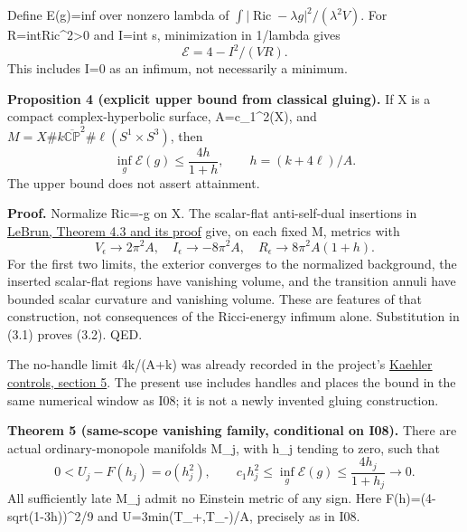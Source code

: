 \documentclass[
  10pt,
]{article}
\begin{document}
Define E(g)=inf over nonzero lambda of
\(\int|\operatorname{Ric}-\lambda g|^2/(\lambda^2 V)\). For
R=int\textbar Ric\textbar\^{}2\textgreater0 and I=int s, minimization in
1/lambda gives \[
 \mathcal E=4-I^2/(VR).                                  \tag{3.1}
\] This includes I=0 as an infimum, not necessarily a minimum.

\textbf{Proposition 4 (explicit upper bound from classical gluing).} If
X is a compact complex-hyperbolic surface, A=c\_1\^{}2(X), and
\(M=X\#k\overline{\mathbb{CP}}^2\#\ell(S^1\times S^3)\), then \[
 \inf_g\mathcal E(g)\le\frac{4h}{1+h},\qquad h=(k+4\ell)/A. \tag{3.2}
\] The upper bound does not assert attainment.

\textbf{Proof.} Normalize Ric=-g on X. The scalar-flat anti-self-dual
insertions in \href{https://arxiv.org/html/math/0003068}{LeBrun, Theorem
4.3 and its proof} give, on each fixed M, metrics with \[
 V_\epsilon\to2\pi^2A,\quad I_\epsilon\to-8\pi^2A,
 \quad R_\epsilon\to8\pi^2A(1+h).                        \tag{3.3}
\] For the first two limits, the exterior converges to the normalized
background, the inserted scalar-flat regions have vanishing volume, and
the transition annuli have bounded scalar curvature and vanishing
volume. These are features of that construction, not consequences of the
Ricci-energy infimum alone. Substitution in (3.1) proves (3.2). QED.

The no-handle limit 4k/(A+k) was already recorded in the project's
\href{../mathematics/current/line1_kahler_energy.md}{Kaehler controls,
section 5}. The present use includes handles and places the bound in the
same numerical window as I08; it is not a newly invented gluing
construction.

\textbf{Theorem 5 (same-scope vanishing family, conditional on I08).}
There are actual ordinary-monopole manifolds M\_j, with h\_j tending to
zero, such that \[
 0<U_j-F(h_j)=o(h_j^2),\qquad
 c_1h_j^2\le\inf_g\mathcal E(g)\le\frac{4h_j}{1+h_j}\to0.  \tag{3.4}
\] All sufficiently late M\_j admit no Einstein metric of any sign. Here
F(h)=(4-sqrt(1-3h))\^{}2/9 and U=3min(T\_+,T\_-)/A, precisely as in I08.
\end{document}
